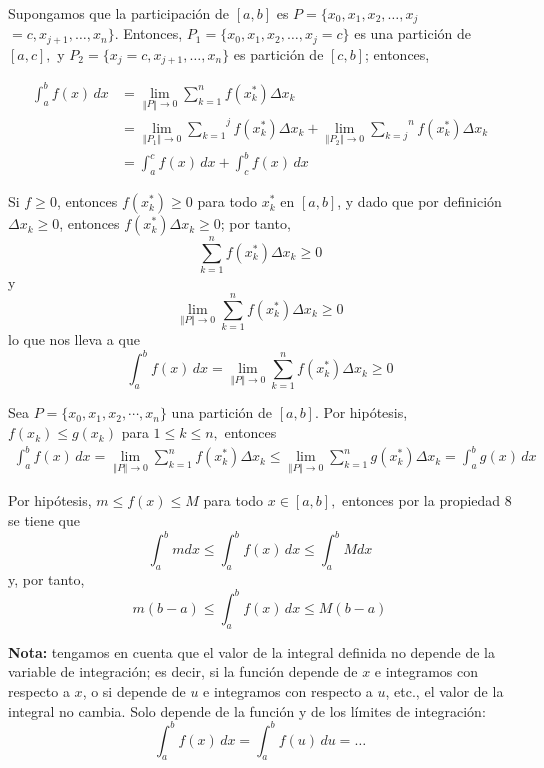 \begin{parrafonumerado}
\item Supongamos que la participación de $[a,b]$ es $P=\{x_{0},x_{1},x_{2},\ldots, x_{j}$ $= c,x_{j+1},\ldots ,x_{n}\}$. Entonces, $P_{1}=\{x_{0},x_{1},x_{2},\ldots, x_{j}=c\}$ es una partición de $[a,c],$ y $P_{2}=\{x_{j}=c,x_{j+1},\ldots ,x_{n}\}$ es partición de $[c,b]$; entonces,

\begin{align*}
\int_{a}^{b}f(x)\,dx&=\underset{\left\Vert P\right\Vert \rightarrow 0}{\lim }\sum_{k=1}^{n}f(x_{k}^{\ast })\Delta x_{k}\\
&=\underset{\left\Vert P_{1}\right\Vert \rightarrow 0}{
\lim }\overset{j}{\underset{k=1}{\sum }}f(x_{k}^{\ast })\Delta x_{k}+%
\underset{\left\Vert P_{2}\right\Vert \rightarrow 0}{\lim }\overset{n}{\underset{k=j}{\sum }}f(x_{k}^{\ast })\Delta x_{k}\\
&=\int_{a}^{c}f(x)\,dx+\int_{c}^{b}f(x)\,dx
\end{align*}

\item Si $f\geq 0$, entonces $f(x_k^*)\geq 0$ para todo $x_k^*$ en $[a,b]$, y dado que por definición $\Delta x_{k}\geq 0$, entonces $f(x_k^*) \Delta x_{k}\geq 0$; por tanto,
\[
\sum_{k=1}^{n}f(x_{k}^{\ast })\Delta x_{k}\geq 0
\]
y
\[
\underset{\left\Vert P\right\Vert \rightarrow 0}{\lim }%
\sum_{k=1}^{n}f(x_{k}^{\ast })\Delta x_{k}\geq 0
\]
lo que nos lleva a que
\[
\int_{a}^{b}f(x)\,dx=\underset{\left\Vert P\right\Vert \rightarrow 0}{\lim }
\sum_{k=1}^{n}f(x_{k}^{\ast })\Delta x_{k}\geq 0
\]

\item Sea $P=\{x_{0},x_{1},x_{2},\cdots ,x_{n}\}$ una partición de $[a,b]$. Por hipótesis, $f\left( x_{k}\right) \leq g\left( x_{k}\right)$ para $1\leq k\leq n,$ entonces
\begin{gather*}
\int_{a}^{b}f(x)\,dx=\underset{\left\Vert P\right\Vert \rightarrow 0}{\lim }
\sum_{k=1}^{n}f(x_{k}^{\ast })\Delta x_{k}\leq
\underset{\left\Vert P\right\Vert \rightarrow 0}{\lim }
\sum_{k=1}^{n}g(x_{k}^{\ast })\Delta x_{k}=\int_{a}^{b}g(x)\,dx
\end{gather*}

\item Por hipótesis, $m\leq f(x)\leq M$ para todo $x\in [a,b],$ entonces por la propiedad $8$ se tiene que
\[
\int_{a}^{b}mdx\leq \int_{a}^{b}f(x)\,dx\leq \int_{a}^{b}Mdx
\]
y, por tanto,
\[
m(b-a)\leq \int_{a}^{b}f(x)\,dx\leq M(b-a)
\]
\end{parrafonumerado}

\textbf{Nota:} tengamos en cuenta que el valor de la integral
definida no depende de la variable de integración; es decir, si la función depende de $x$ e integramos con respecto a $x$, o si depende de $u$ e integramos con respecto a $u$, etc., el valor de la integral no cambia. Solo depende de la función y de los límites de integración:
\[
\int_a^bf(x)\,dx=\int_a^b f(u)\, du=\ldots
\]

